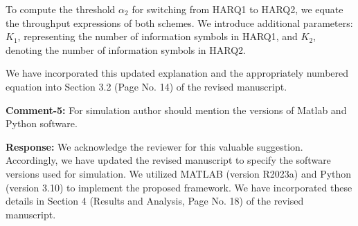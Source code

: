 \documentclass[a4paper,10pt]{article}
\begin{document}
\begin{enumerate}
To compute the threshold \( \alpha_2 \) for switching from HARQ1 to HARQ2, we equate the throughput expressions of both schemes. We introduce additional parameters: \( K_1 \), representing the number of information symbols in HARQ1, and \( K_2 \), denoting the number of information symbols in HARQ2.  

We have incorporated this updated explanation and the appropriately numbered equation into Section 3.2 (Page No. 14) of the revised manuscript.


{\color{blue} \item \textbf{Comment-5:} For simulation author should mention the versions of Matlab and Python software.} 

\textbf{Response:} We acknowledge the reviewer for this valuable suggestion. Accordingly, we have updated the revised manuscript to specify the software versions used for simulation. We utilized MATLAB (version R2023a) and Python (version 3.10) to implement the proposed framework. We have incorporated these details in Section 4 (Results and Analysis, Page No. 18) of the revised manuscript.


\end{enumerate}
\end{document}

